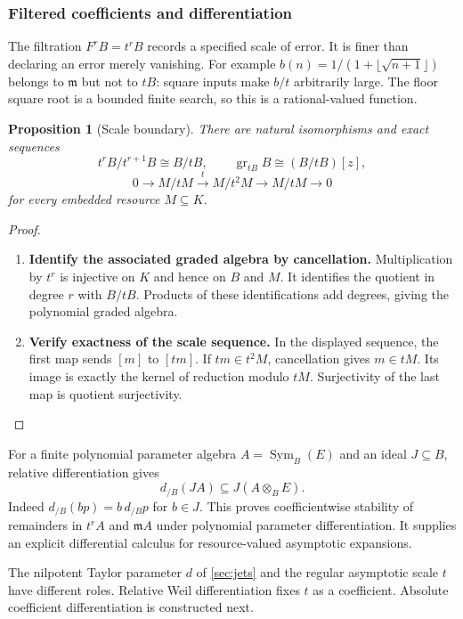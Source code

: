 \documentclass[11pt,a4paper]{article}
\numberwithin{algorithm}{section}
\numberwithin{equation}{section}
\newtheorem{proposition}[proposition]{Proposition}
\theoremstyle{definition}
\theoremstyle{remark}
\theoremstyle{plain}
\newcommand{\Sym}{\operatorname{Sym}}
\newcommand{\gr}{\operatorname{gr}}
\theoremstyle{definition}
\theoremstyle{plain}
\begin{document}
\subsubsection{Filtered coefficients and differentiation}
The filtration $F^rB=t^rB$ records a specified scale of
error. It is finer than declaring an error merely vanishing.
For example
$b(n)=1/(1+\lfloor\sqrt{n+1}\rfloor)$ belongs to $\mathfrak m$
but not to $tB$: square inputs make $b/t$ arbitrarily large.
The floor square root is a bounded finite search, so this
is a rational-valued function.

\begin{proposition}[Scale boundary]\label{prop:scale-boundary}
There are natural isomorphisms and exact sequences
\[
 t^rB/t^{r+1}B\cong B/tB,\qquad
 \gr_{tB}B\cong(B/tB)[z],
\]
\[
 0\longrightarrow M/tM\xrightarrow{\ t\ }M/t^2M
 \longrightarrow M/tM\longrightarrow0
\]
for every embedded resource $M\subseteq K$.
\end{proposition}
\begin{proof}\leavevmode
\begin{enumerate}[leftmargin=*,align=left]
\item \textbf{Identify the associated graded algebra by cancellation.}
Multiplication by $t^r$ is injective on $K$ and hence on $B$
and $M$. It identifies the quotient in degree $r$ with
$B/tB$. Products of these identifications add degrees,
giving the polynomial graded algebra.

\item \textbf{Verify exactness of the scale sequence.}
In the displayed sequence, the first map sends $[m]$ to
$[tm]$. If $tm\in t^2M$, cancellation gives $m\in tM$.
Its image is exactly the kernel of reduction modulo $tM$.
Surjectivity of the last map is quotient surjectivity.
\end{enumerate}
\end{proof}

For a finite polynomial parameter algebra $A=\Sym_B(E)$
and an ideal $J\subseteq B$, relative differentiation gives
\[
 d_{/B}(JA)\subseteq J(A\otimes_BE).
\]
Indeed $d_{/B}(bp)=b\,d_{/B}p$ for $b\in J$.
This proves coefficientwise stability of remainders in
$t^rA$ and $\mathfrak m A$ under polynomial parameter
differentiation. It supplies an explicit differential
calculus for resource-valued asymptotic expansions.

The nilpotent Taylor parameter $d$ of \cref{sec:jets} and
the regular asymptotic scale $t$ have different
roles. Relative Weil differentiation fixes $t$ as a
coefficient. Absolute coefficient differentiation is
constructed next.
\end{document}
